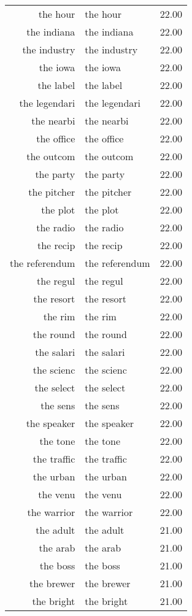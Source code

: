 \begin{table}[ht]
\begin{tabular}{rlr}
  the hour & the hour & 22.00 \\ 
  the indiana & the indiana & 22.00 \\ 
  the industry & the industry & 22.00 \\ 
  the iowa & the iowa & 22.00 \\ 
  the label & the label & 22.00 \\ 
  the legendari & the legendari & 22.00 \\ 
  the nearbi & the nearbi & 22.00 \\ 
  the office & the office & 22.00 \\ 
  the outcom & the outcom & 22.00 \\ 
  the party & the party & 22.00 \\ 
  the pitcher & the pitcher & 22.00 \\ 
  the plot & the plot & 22.00 \\ 
  the radio & the radio & 22.00 \\ 
  the recip & the recip & 22.00 \\ 
  the referendum & the referendum & 22.00 \\ 
  the regul & the regul & 22.00 \\ 
  the resort & the resort & 22.00 \\ 
  the rim & the rim & 22.00 \\ 
  the round & the round & 22.00 \\ 
  the salari & the salari & 22.00 \\ 
  the scienc & the scienc & 22.00 \\ 
  the select & the select & 22.00 \\ 
  the sens & the sens & 22.00 \\ 
  the speaker & the speaker & 22.00 \\ 
  the tone & the tone & 22.00 \\ 
  the traffic & the traffic & 22.00 \\ 
  the urban & the urban & 22.00 \\ 
  the venu & the venu & 22.00 \\ 
  the warrior & the warrior & 22.00 \\ 
  the adult & the adult & 21.00 \\ 
  the arab & the arab & 21.00 \\ 
  the boss & the boss & 21.00 \\ 
  the brewer & the brewer & 21.00 \\ 
  the bright & the bright & 21.00 \\ 

\end{tabular}
\end{table}
